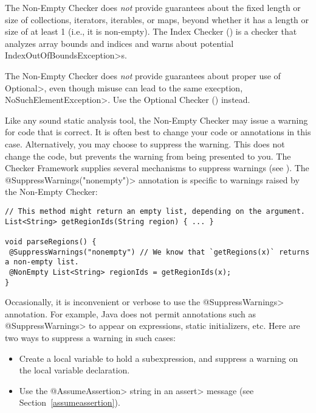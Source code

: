 The Non-Empty Checker does \emph{not} provide guarantees about the fixed
length or size of collections, iterators, iterables, or maps, beyond whether
it has a length or size of at least 1 (i.e., it is non-empty).
The Index Checker () is a checker that analyzes
array bounds and indices and warns about potential
\<IndexOutOfBoundsException>s.

The Non-Empty Checker does \emph{not} provide guarantees about proper use
of \<Optional>, even though misuse can lead to the same execption,
\<NoSuchElementException>.  Use the Optional Checker
() instead.



Like any sound static analysis tool, the Non-Empty Checker may issue a warning
for code that is correct.
It is often best to change your code or annotations in this case.
Alternatively, you may choose to suppress the warning.
This does not change the code, but prevents the warning from being presented to
you.
The Checker Framework supplies several mechanisms to suppress warnings (see
).
The \<@SuppressWarnings("nonempty")> annotation is specific to warnings raised
by the Non-Empty Checker:

\begin{Verbatim}
// This method might return an empty list, depending on the argument.
List<String> getRegionIds(String region) { ... }

void parseRegions() {
 @SuppressWarnings("nonempty") // We know that `getRegions(x)` returns a non-empty list.
 @NonEmpty List<String> regionIds = getRegionIds(x);
}
\end{Verbatim}


Occasionally, it is inconvenient or verbose to use the \<@SuppressWarnings>
annotation.
For example, Java does not permit annotations such as \<@SuppressWarnings> to
appear on expressions, static initializers, etc.
Here are two ways to suppress a warning in such cases:

\begin{itemize}
\item
  Create a local variable to hold a subexpression, and
  suppress a warning on the local variable declaration.
\item
  Use the \<@AssumeAssertion> string in
  an \<assert> message (see Section~\ref{assumeassertion}).
\end{itemize}

